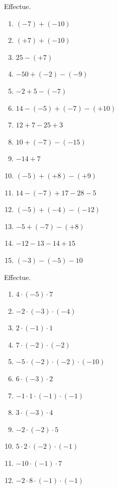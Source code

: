 \documentclass[parskip=half-, 12pt, DIV=15, twoside=semi]{scrbook}
\begin{document}
\pagebreak
\begin{exercise}
    Effectue. 
    \begin{enumerate}[cols=3, itemsep=1em]
        \item $(-7)+(-10)$
        \item $( + 7) + ( - 10)$
        \item $25 - ( + 7)$
        \item $-50+(-2)-(-9)$
        \item $-2+5-(-7)$
        \item $14-(-5)+(-7)-(+10)$
        \item $12 + 7 - 25 + 3$
        \item $10 + ( - 7) - ( - 15)$
        \item $- 14 + 7$
        \item $( - 5) + ( + 8) - ( + 9)$
        \item $14 - ( - 7) + 17 - 28 - 5$
        \item $( - 5) + ( - 4) - ( - 12)$
        \item $- 5 + ( - 7) - ( + 8)$
        \item $- 12 - 13 - 14 + 15$
        \item $(-3)- (-5) - 10$
    \end{enumerate}
\end{exercise}

\begin{exercise}
    Effectue.
    \begin{enumerate}[cols=3, itemsep=.3cm]
        \item \(4\cdot (-5) \cdot 7\)
        \item \(-2\cdot (-3)\cdot (-4)\)
        \item \(2\cdot (-1)\cdot 1\)
        \item \(7\cdot (-2)\cdot (-2)\)
        \item \(-5\cdot (-2)\cdot (-2)\cdot  (-10)\)
        \item \(6\cdot (-3) \cdot 2\)
        \item \(-1 \cdot 1 \cdot (-1) \cdot (-1)\)
        \item \(3\cdot (-3) \cdot 4\)
        \item \(-2\cdot (-2) \cdot 5\)
        \item \(5 \cdot 2 \cdot (-2) \cdot (-1)\)
        \item \(-10 \cdot (-1) \cdot 7\)
        \item \(-2 \cdot 8 \cdot (-1) \cdot (-1)\)
    \end{enumerate}
\end{exercise}
\end{document}
